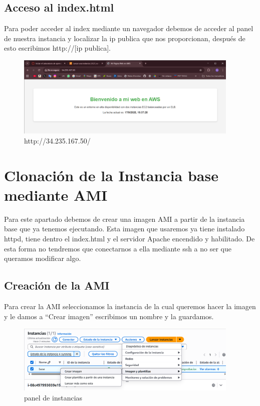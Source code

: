 \documentclass{article}
\begin{document}
\subsection{Acceso al index.html}

	Para poder acceder al index mediante un navegador debemos de acceder al panel de nuestra instancia y localizar la ip publica que nos proporcionan, después de esto escribimos http://[ip publica].

	\begin{figure}[H]
	\centering
	\includegraphics[width=0.95\textwidth]{index.png}
	\caption{http://34.235.167.50/}
	\end{figure}



\newpage


\section{Clonación de la Instancia base mediante AMI}

	Para este apartado debemos de crear una imagen AMI a partir de la instancia base que ya tenemos ejecutando. Esta imagen que usaremos ya tiene instalado httpd, tiene dentro el index.html y el servidor Apache encendido y habilitado. De esta forma no tendremos que conectarnos a ella mediante ssh a no ser que queramos modificar algo.

\subsection{Creación de la AMI}

	Para crear la AMI seleccionamos la instancia de la cual queremos hacer la imagen y le damos a ``Crear imagen'' escribimos un nombre y la guardamos.

	

	\begin{figure}[H]
	\centering
	\includegraphics[width=0.95\textwidth]{crear_imagen.png}
	\caption{panel de instancias}
	\end{figure}
\end{document}

